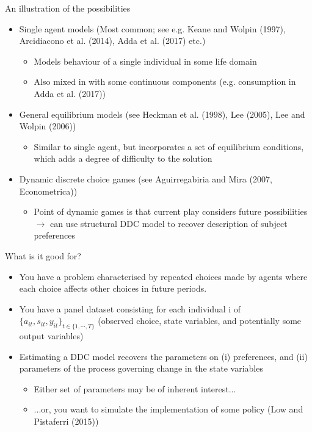 \documentclass[aspectratio=169]{beamer}
\begin{document}
	\begin{frame}{An illustration of the possibilities}
		\pause
		\begin{itemize}
			\itemsep1em
			\item Single agent models (Most common; see e.g. Keane and Wolpin (1997), Arcidiacono et al. (2014), Adda et al. (2017) etc.)
			\begin{itemize}
				\itemsep0.5em
				\item Models behaviour of a single individual in some life domain
				\item Also mixed in with some continuous components (e.g. consumption in Adda et al. (2017))
			\end{itemize}
			\pause
			\item General equilibrium models (see Heckman et al. (1998), Lee (2005), Lee and Wolpin (2006))
			\begin{itemize}
				\item Similar to single agent, but incorporates a set of equilibrium conditions, which adds a degree of difficulty to the solution
			\end{itemize}
			\pause
			\item Dynamic discrete choice games (see Aguirregabiria and Mira (2007, Econometrica))
			\begin{itemize}
				\itemsep0.5em
				\item Point of dynamic games is that current play considers future possibilities $\rightarrow$ can use structural DDC model to recover description of subject preferences
			\end{itemize}
		\end{itemize}
	\end{frame}
	
	\begin{frame}{What is it good for?}
		\begin{itemize}
			\itemsep1em
			\item You have a problem characterised by repeated choices made by agents where each choice affects other choices in future periods.
			\pause
			\item You have a panel dataset consisting for each individual i of $\{a_{it},s_{it},y_{it}\}_{t \in \{1,\cdots,T\}}$ (observed choice, state variables, and potentially some output variables)
			\pause
			\item Estimating a DDC model recovers the parameters on (i) preferences, and (ii) parameters of the process governing change in the state variables
			\pause
			\begin{itemize}
				\itemsep0.5em
				\item Either set of parameters may be of inherent interest...
				\item ...or, you want to simulate the implementation of some policy (Low and Pistaferri (2015))
			\end{itemize}
		\end{itemize}
	\end{frame}
	
\end{document}
